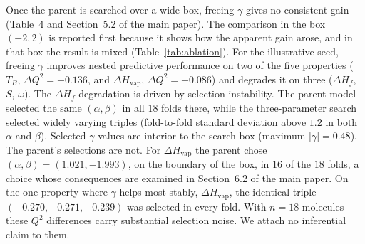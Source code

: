 \documentclass[a5paper, 10pt]{article}
\theoremstyle{plain}
\theoremstyle{remark}
\theoremstyle{definition}
\begin{document}
Once the parent is searched over a wide
box, freeing $\gamma$ gives no consistent gain
(Table~4 and Section~5.2 of the main paper). The comparison in the
box $(-2,2)$ is reported first because it shows how the apparent
gain arose, and in that box the result is mixed
(Table~\ref{tab:ablation}). For the illustrative seed, freeing $\gamma$
improves nested predictive performance on two of the five properties
($T_B$, $\Delta Q^2 = +0.136$, and $\Delta H_{\mathrm{vap}}$,
$\Delta Q^2 = +0.086$) and degrades it on three
($\Delta H_f$, $S$, $\omega$). The $\Delta H_f$ degradation is driven
by selection instability. The parent model selected the same
$(\alpha,\beta)$ in all $18$ folds there, while the three-parameter
search selected widely varying triples (fold-to-fold standard
deviation above $1.2$ in both $\alpha$ and $\beta$). Selected
$\gamma$ values are interior to the search box (maximum
$|\gamma| = 0.48$). The parent's selections are not. For
$\Delta H_{\mathrm{vap}}$ the parent chose $(\alpha,\beta) =
(1.021, -1.993)$, on the boundary of the box, in $16$ of the $18$
folds, a choice whose consequences are examined in Section~6.2
of the main paper. On the one property where
$\gamma$ helps most stably, $\Delta H_{\mathrm{vap}}$, the identical
triple $(-0.270, +0.271, +0.239)$ was selected in every fold. With
$n = 18$ molecules these $Q^2$ differences carry substantial
selection noise. We attach no inferential claim to them.
\end{document}
